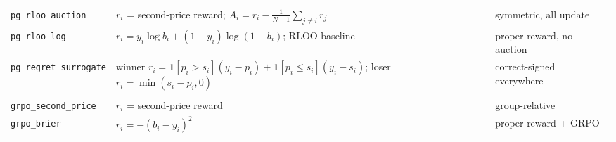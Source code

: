 \begin{table}[t]
\begin{tabular}{@{}lll@{}}
\texttt{pg\_rloo\_auction}    & $r_i$ = second-price reward; $A_i\!=\!r_i-\frac{1}{N-1}\sum_{j\ne i}r_j$ & symmetric, all update \\
\texttt{pg\_rloo\_log}        & $r_i\!=\!y_i\log b_i+(1-y_i)\log(1-b_i)$; RLOO baseline & proper reward, no auction \\
\texttt{pg\_regret\_surrogate}& winner $r_i\!=\!\mathbf{1}[p_i\!>\!s_i](y_i-p_i)+\mathbf{1}[p_i\!\le\!s_i](y_i-s_i)$; loser $r_i\!=\!\min(s_i-p_i,0)$ & correct-signed everywhere \\
\addlinespace
\multicolumn{3}{@{}l}{\emph{GRPO --- $\ell_i=-A_i\log\pi_i(b_i)$,\; $A_i=(r_i-\mathrm{mean}_j r_j)/(\mathrm{std}_j r_j+\varepsilon)$}}\\
\texttt{grpo\_second\_price}  & $r_i$ = second-price reward & group-relative \\
\texttt{grpo\_brier}          & $r_i=-(b_i-y_i)^2$ & proper reward + GRPO \\
\bottomrule
\end{tabular}
\end{table}
